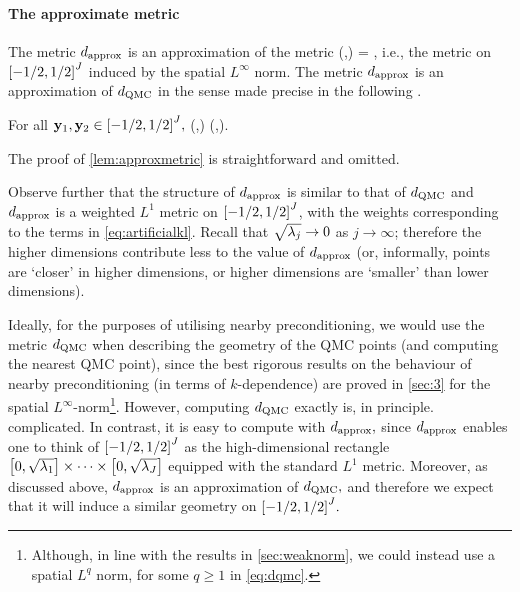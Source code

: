\paragraph{The approximate metric} The metric $d_{\mathrm{approx}}$ is an approximation of the metric
\beq\label{eq:dqmc}
\dQMC(\byo,\byt) = ,%
\eeq
i.e., the metric on $\cube{J}$ induced by the spatial $L^\infty$ norm. The metric $d_{\mathrm{approx}}$ is an approximation of $d_{\mathrm{QMC}}$ in the sense made precise in the following .

\label{lem:approxmetric}
For all $\byo,\byt \in \cube{J},$
\beqs
\dQMC\mleft(\byo,\byt\mright) \leq \dapprox\mleft(\byo,\byt\mright).
\eeqs
\ele

The proof of \cref{lem:approxmetric} is straightforward and omitted.

Observe further that the structure of $d_{\mathrm{approx}}$ is similar to that of $d_{\mathrm{QMC}}$ and $d_{\mathrm{approx}}$ is a weighted $L^1$ metric on $\cube{J}$, with the weights corresponding to the terms in \cref{eq:artificialkl}. Recall that $\sqrt{\lambda_{j}} \rightarrow 0$ as $j \rightarrow \infty$; therefore the higher dimensions contribute less to the value of $d_{\mathrm{approx}}$ (or, informally, points are `closer' in higher dimensions, or higher dimensions are `smaller' than lower dimensions).

Ideally, for the purposes of utilising nearby preconditioning, we would use the metric $d_{\mathrm{QMC}}$ when describing the geometry of the QMC points  (and computing the nearest QMC point), since the best rigorous results on the behaviour of nearby preconditioning (in terms of $k$-dependence) are proved in \cref{sec:3} for the spatial $L^\infty$-norm\footnote{Although, in line with the results in \cref{sec:weaknorm}, we could instead use a spatial $L^q$ norm, for some $q \geq 1$ in \cref{eq:dqmc}.}. However, computing $d_{\mathrm{QMC}}$ exactly is, in principle. complicated. In contrast, it is easy to compute with $d_{\mathrm{approx}},$ since $d_{\mathrm{approx}}$ enables one to think of $\cube{J}$ as the high-dimensional rectangle $\mleft[0,\sqrt{\lambdao}\mright]\times\cdots\times\mleft[0,\sqrt{\lambdaJ}\mright]$ equipped with the standard $L^1$ metric. Moreover, as discussed above, $d_{\mathrm{approx}}$ is an approximation of $d_{\mathrm{QMC}},$ and therefore we expect that it will induce a similar geometry on $\cube{J}.$

